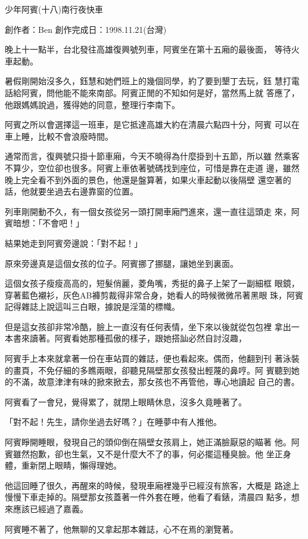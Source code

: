 



少年阿賓(十八)南行夜快車

創作者：Ben
創作完成日：1998.11.21(台灣)


晚上十一點半，台北發往高雄復興號列車，阿賓坐在第十五廂的最後面，
等待火車起動。

暑假剛開始沒多久，鈺慧和她們班上的幾個同學，約了要到墾丁去玩，鈺
慧打電話給阿賓，問他能不能來南部。阿賓正閒的不知如何是好，當然馬上就
答應了，他跟媽媽說過，獲得她的同意，整理行李南下。

阿賓之所以會選擇這一班車，是它抵達高雄大約在清晨六點四十分，阿賓
可以在車上睡，比較不會浪廢時間。

通常而言，復興號只掛十節車廂，今天不曉得為什麼掛到十五節，所以雖
然乘客不算少，空位卻也很多。阿賓上車依著號碼找到座位，可惜是靠在走道
邊，雖然晚上完全看不到外面的景色，他還是盤算著，如果火車起動以後隔壁
還空著的話，他就要坐過去右邊靠窗的位置。

列車剛開動不久，有一個女孩從另一頭打開車廂門進來，還一直往這頭走
來，阿賓暗想：「不會吧！」

結果她走到阿賓旁邊說：「對不起！」

原來旁邊真是這個女孩的位子。阿賓挪了挪腿，讓她坐到裏面。

這個女孩子瘦瘦高高的，短髮俏麗，菱角嘴，秀挺的鼻子上架了一副細框
眼鏡，穿著藍色襯衫，灰色AB褲剪裁得非常合身，她看人的時候微微吊著黑眼
珠，阿賓記得雜誌上說這叫三白眼，據說是淫蕩的標幟。

但是這女孩卻非常冷酷，臉上一直沒有任何表情，坐下來以後就從包包裡
拿出一本書來讀著。阿賓看她那種孤傲的樣子，跟她搭訕必然自討沒趣，

阿賓手上本來就拿著一份在車站買的雜誌，便也看起來。偶而，他翻到刊
著泳裝的畫頁，不免仔細的多瞧兩眼，卻聽見隔壁那女孩發出輕蔑的鼻哼。阿
賓聽到她的不滿，故意津津有味的掀來掀去，那女孩也不再管他，專心地讀起
自己的書。

阿賓看了一會兒，覺得累了，就閉上眼睛休息，沒多久竟睡著了。

「對不起！先生，請你坐過去好嗎？」在睡夢中有人推他。

阿賓睜開睡眼，發現自己的頭仰倒在隔壁女孩肩上，她正滿臉厭惡的瞄著
他。阿賓雖然抱歉，卻也生氣，又不是什麼大不了的事，何必擺這種臭臉。他
坐正身體，重新閉上眼睛，懶得理她。

他這回睡了很久，再醒來的時候，發現車廂裡幾乎已經沒有旅客，大概是
路途上慢慢下車走掉的。隔壁那女孩蓋著一件外套在睡，他看了看錶，清晨四
點多，想來應該已經過了嘉義。

阿賓睡不著了，他無聊的又拿起那本雜誌，心不在焉的瀏覽著。

